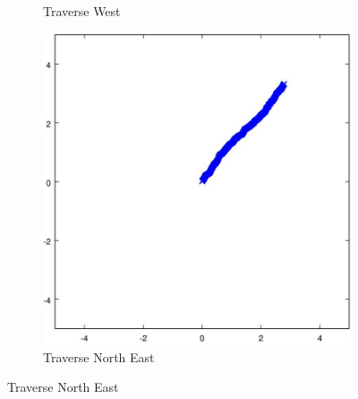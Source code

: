 \documentclass{article}
\begin{document}
\begin{figure}[H]
\begin{subfigure}[b]{0.32\linewidth}
		\caption{Traverse West}
	\end{subfigure}
	\begin{subfigure}[b]{0.32\linewidth}
		\includegraphics[width=\textwidth]{images/traverse_north_east_with_noise.jpg}
		\caption{Traverse North East}
	\end{subfigure}
	

\end{figure}
\end{document}
